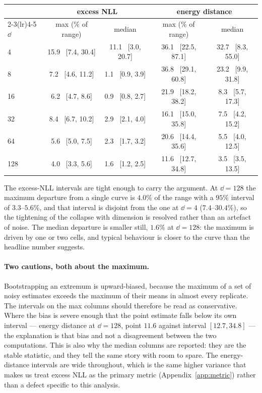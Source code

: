 \begin{center}
\small
\begin{tabular}{lcccc}
\toprule
& \multicolumn{2}{c}{excess NLL} & \multicolumn{2}{c}{energy distance} \\
\cmidrule(lr){2-3}\cmidrule(lr){4-5}
$\dd$ & max (\% of range) & median & max (\% of range) & median \\
\midrule
4   & 15.9 \, [7.4, 30.4] & 11.1 \, [3.0, 20.7] & 36.1 \, [22.5, 87.1] & 32.7 \, [8.3, 55.0] \\
8   & 7.2 \, [4.6, 11.2]  & 1.1 \, [0.9, 3.9]   & 36.8 \, [29.1, 60.8] & 23.2 \, [9.9, 31.8] \\
16  & 6.2 \, [4.7, 8.6]   & 0.9 \, [0.8, 2.7]   & 21.9 \, [18.2, 38.2] & 8.3 \, [5.7, 17.3] \\
32  & 8.4 \, [6.7, 10.2]  & 2.9 \, [2.1, 4.0]   & 16.1 \, [15.0, 35.8] & 7.5 \, [4.2, 15.2] \\
64  & 5.6 \, [5.0, 7.5]   & 2.3 \, [1.7, 3.2]   & 20.6 \, [14.4, 35.6] & 5.5 \, [4.0, 12.5] \\
128 & 4.0 \, [3.3, 5.6]   & 1.6 \, [1.2, 2.5]   & 11.6 \, [12.7, 34.8] & 3.5 \, [3.5, 13.5] \\
\bottomrule
\end{tabular}
\end{center}

The excess-NLL intervals are tight enough to carry the argument. At $\dd{=}128$ the maximum departure
from a single curve is $4.0\%$ of the range with a $95\%$ interval of $3.3$--$5.6\%$, and that
interval is disjoint from the one at $\dd{=}4$ ($7.4$--$30.4\%$), so the tightening of the collapse
with dimension is resolved rather than an artefact of noise. The median departure is smaller
still, $1.6\%$ at $\dd{=}128$: the maximum is driven by one or two cells, and typical behaviour is
closer to the curve than the headline number suggests.

\paragraph{Two cautions, both about the maximum.} Bootstrapping an extremum is upward-biased, because
the maximum of a set of noisy estimates exceeds the maximum of their means in almost every replicate.
The intervals on the max columns should therefore be read as conservative. Where the bias is severe
enough that the point estimate falls below its own interval --- energy distance at $\dd{=}128$, point
$11.6$ against interval $[12.7, 34.8]$ --- the explanation is that bias and not a disagreement
between the two computations. This is also why the median columns are reported: they are the stable
statistic, and they tell the same story with room to spare. The energy-distance intervals are wide
throughout, which is the same higher variance that makes us treat excess NLL as the primary metric
(Appendix~\ref{app:metric}) rather than a defect specific to this analysis.

